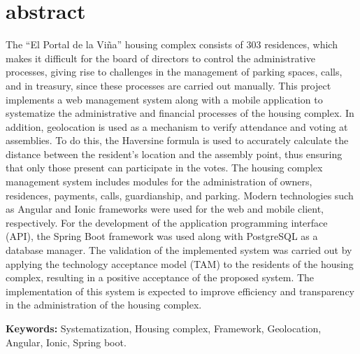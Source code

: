 \newpage
\chapter*{abstract}

The {\textquotedblleft}El Portal de la Viña{\textquotedblright} housing complex consists of 303 residences, which makes it difficult for the board of directors to control the administrative processes, giving rise to challenges in the management of parking spaces, calls, and in treasury, since these processes are carried out manually.
\bigbreak
This project implements a web management system along with a mobile application to systematize the administrative and financial processes of the housing complex. In addition, geolocation is used as a mechanism to verify attendance and voting at assemblies. To do this, the Haversine formula is used to accurately calculate the distance between the resident's location and the assembly point, thus ensuring that only those present can participate in the votes.
\bigbreak
The housing complex management system includes modules for the administration of owners, residences, payments, calls, guardianship, and parking. Modern technologies such as Angular and Ionic frameworks were used for the web and mobile client, respectively. For the development of the application programming interface (API), the Spring Boot framework was used along with PostgreSQL as a database manager.
\bigbreak
The validation of the implemented system was carried out by applying the technology acceptance model (TAM) to the residents of the housing complex, resulting in a positive acceptance of the proposed system. The implementation of this system is expected to improve efficiency and transparency in the administration of the housing complex.

\vfill
\textbf{Keywords:} Systematization, Housing complex, Framework, Geolocation, Angular, Ionic, Spring boot.
